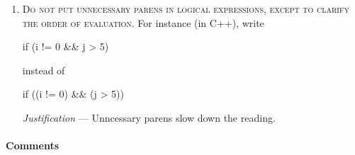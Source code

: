 \documentclass{tufte-book}
\newcounter{points}
\renewcommand{\rule}[1]{\textsc{#1}}
\newcommand{\commentcs}[1]{\newline #1}
\newcommand{\commentf}[1]{#1}
\newcommand{\njustification}[1]{{\it Justification} --- #1}
\newenvironment{cenumerate}
{
  \begin{enumerate}\setcounter{enumi}{\value{points}}%
  }
  {
    \setcounter{points}{\value{enumi}}\end{enumerate}
}
\begin{document}
\begin{cenumerate}
  \commentcs{Write}
\begin{frame_cpp}
  while (error > epsilon)
\end{frame_cpp}
  \commentf{instead of}
\begin{frame_cpp}
  while(error > epsilon)
\end{frame_cpp}
  \njustification{Keywords and functions should be distinguishable.}
\item \rule{Do not put unnecessary parens in logical expressions, except to
    clarify the order of evaluation.}  \commentcs{For instance (in C++), write}
\begin{frame_cpp}
  if (i != 0 && j > 5)
\end{frame_cpp}
\commentf{instead of}
\begin{frame_cpp}
  if ((i != 0) && (j > 5))
\end{frame_cpp}
\njustification{Unncessary parens slow down the reading.}
\end{cenumerate}

\paragraph{Comments}
\end{document}
